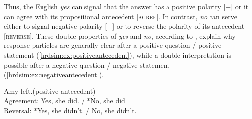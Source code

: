 \documentclass[output=paper,colorlinks,citecolor=brown]{langscibook}
\begin{document}




Thus, the English \textit{yes} can signal that the answer has a positive polarity [+] or it can agree with its propositional antecedent [\textsc{agree}]. In contrast, \textit{no} can serve either to signal negative polarity [$-$] or to reverse the polarity of its antecedent [\textsc{reverse}]. These double properties of \textit{yes} and \textit{no}, according to \citet[383]{roelofsen-farkas15}, explain why response particles are generally clear after a positive question / positive statement (\ref{hrdsim:ex:positiveantecedent}), while a double interpretation is possible after a negative question / negative statement (\ref{hrdsim:ex:negativeantecedent}).

\begin{exe}
\ex \label{hrdsim:ex:positiveantecedent}
Amy left.\hfill (positive antecedent)\\
Agreement: Yes, she did. / *No, she did.\\
Reversal: *Yes, she didn't. / No, she didn't.   
\end{exe}
\end{document}
